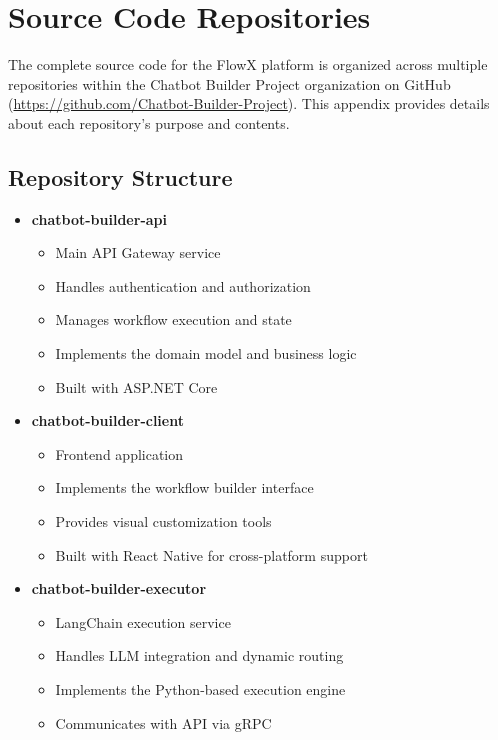 \chapter{Source Code Repositories}
The complete source code for the FlowX platform is organized across multiple repositories within the Chatbot Builder Project organization on GitHub (\url{https://github.com/Chatbot-Builder-Project}). This appendix provides details about each repository's purpose and contents.

\section{Repository Structure}
\begin{itemize}
    \item \textbf{chatbot-builder-api}
    \begin{itemize}
        \item Main API Gateway service
        \item Handles authentication and authorization
        \item Manages workflow execution and state
        \item Implements the domain model and business logic
        \item Built with ASP.NET Core
    \end{itemize}
    
    \item \textbf{chatbot-builder-client}
    \begin{itemize}
        \item Frontend application
        \item Implements the workflow builder interface
        \item Provides visual customization tools
        \item Built with React Native for cross-platform support
    \end{itemize}
    
    \item \textbf{chatbot-builder-executor}
    \begin{itemize}
        \item LangChain execution service
        \item Handles LLM integration and dynamic routing
        \item Implements the Python-based execution engine
        \item Communicates with API via gRPC
    \end{itemize}
    

\end{itemize}

